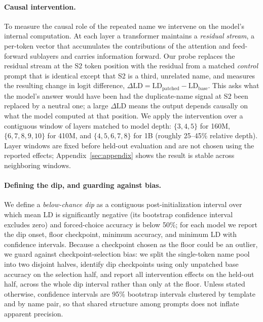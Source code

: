 \documentclass[11pt]{article}
\begin{document}
\paragraph{Causal intervention.}
To measure the causal role of the repeated name we intervene on the model's
internal computation. At each layer a transformer maintains a \emph{residual
stream}, a per-token vector that accumulates the contributions of the attention
and feed-forward sublayers and carries information forward. Our probe replaces
the residual stream at the S2 token position with the residual from a matched
\emph{control} prompt that is identical except that S2 is a third, unrelated
name, and measures the resulting change in logit difference,
$\Delta\mathrm{LD}=\mathrm{LD}_{\text{patched}}-\mathrm{LD}_{\text{base}}$. This
asks what the model's answer would have been had the duplicate-name signal at S2
been replaced by a neutral one; a large $\Delta\mathrm{LD}$ means the output
depends causally on what the model computed at that position. We apply the
intervention over a contiguous window of layers matched to model depth:
$\{3,4,5\}$ for 160M, $\{6,7,8,9,10\}$ for 410M, and $\{4,5,6,7,8\}$ for 1B
(roughly 25--45\% relative depth). Layer windows are fixed before held-out
evaluation and are not chosen using the reported effects;
Appendix~\ref{sec:appendix} shows the result is stable across neighboring
windows.

\paragraph{Defining the dip, and guarding against bias.}
We define a \emph{below-chance dip} as a contiguous post-initialization interval
over which mean LD is significantly negative (its bootstrap confidence interval
excludes zero) and forced-choice accuracy is below 50\%; for each model we report
the dip onset, floor checkpoint, minimum accuracy, and minimum LD with confidence
intervals. Because a checkpoint chosen as the floor could be an outlier, we guard
against checkpoint-selection bias: we split the single-token name pool into two
disjoint halves, identify dip checkpoints using only unpatched base accuracy on
the selection half, and report all intervention effects on the held-out half,
across the whole dip interval rather than only at the floor. Unless stated
otherwise, confidence intervals are 95\% bootstrap intervals clustered by
template and by name pair, so that shared structure among prompts does not
inflate apparent precision.

\end{document}
